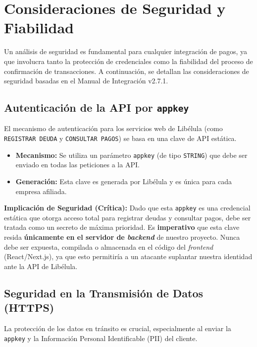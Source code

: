 \section{Consideraciones de Seguridad y Fiabilidad}
    Un análisis de seguridad es fundamental para cualquier integración de pagos, ya que involucra tanto la protección 
    de credenciales como la fiabilidad del proceso de confirmación de transacciones. A continuación, se detallan las 
    consideraciones de seguridad basadas en el Manual de Integración v2.7.1.\par

    \subsection{Autenticación de la API por \texttt{appkey}}
        El mecanismo de autenticación para los servicios web de Libélula (como \texttt{REGISTRAR DEUDA} y \texttt{CONSULTAR PAGOS}) 
        se basa en una clave de API estática.

        \begin{itemize}
            \item \textbf{Mecanismo:} Se utiliza un parámetro \texttt{appkey} (de tipo \texttt{STRING}) que debe ser enviado en todas las peticiones a la API.
            \item \textbf{Generación:} Esta clave es generada por Libélula y es única para cada empresa afiliada.
        \end{itemize}

        \noindent
        \textbf{Implicación de Seguridad (Crítica):} Dado que esta \texttt{appkey} es una credencial estática que otorga 
        acceso total para registrar deudas y consultar pagos, debe ser tratada como un secreto de máxima prioridad. Es 
        \textbf{imperativo} que esta clave resida \textbf{únicamente en el servidor de \emph{backend}} de nuestro proyecto. 
        Nunca debe ser expuesta, compilada o almacenada en el código del \emph{frontend} (React/Next.js), ya que esto permitiría 
        a un atacante suplantar nuestra identidad ante la API de Libélula.\par

    \subsection{Seguridad en la Transmisión de Datos (HTTPS)}
    La protección de los datos en tránsito es crucial, especialmente al enviar la \texttt{appkey} y la Información Personal 
    Identificable (PII) del cliente.\par

